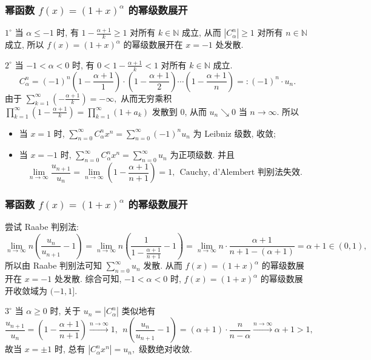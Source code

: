\begin{frame}
\frametitle{幂函数 $f(x) = (1 + x)^{\alpha}$ 的幂级数展开}

$1^\circ$ 当 $\alpha \leqslant -1$ 时, 有 $1 - \frac{\alpha+1}{k} \geqslant 1$ 对所有 $k \in \mathbb{N}$ 成立, 从而 $|C_\alpha^n| \geqslant 1$ 对所有 $n \in \mathbb{N}$ 成立, 所以 $f(x) = (1 + x)^{\alpha}$ 的幂级数展开在 $x = -1$ 处发散.

\pause
\vspace{0.5em}

$2^\circ$ 当 $-1 < \alpha < 0$ 时, 有 $0 < 1 - \frac{\alpha+1}{k} < 1$ 对所有 $k \in \mathbb{N}$ 成立.
\[
C_\alpha^n = (-1)^n \left( 1 - \frac{\alpha+1}{1} \right) \cdot \left( 1 - \frac{\alpha+1}{2} \right) \cdots \left( 1 - \frac{\alpha+1}{n} \right) =: (-1)^n \cdot u_n.
\]
由于 $\sum_{k=1}^\infty \left( - \frac{\alpha+1}{k} \right) = -\infty,$ 从而无穷乘积 $\prod_{k=1}^\infty \left( 1 - \frac{\alpha+1}{k} \right) = \prod_{k=1}^\infty (1 + a_k)$ 发散到 $0$, 从而 $u_n \searrow 0$ 当 $n \to \infty$. 所以
\begin{itemize}
\item 当 $x = 1$ 时, $\sum_{n=0}^\infty C_\alpha^n x^n = \sum_{n=0}^\infty (-1)^n u_n$ 为 Leibniz 级数, 收敛;
\pause
\item 当 $x = -1$ 时, $\sum_{n=0}^\infty C_\alpha^n x^n = \sum_{n=0}^\infty u_n$ 为正项级数. 并且
\[
\lim_{n \to \infty} \frac{u_{n+1}}{u_n} = \lim_{n \to \infty} \left( 1 - \frac{\alpha+1}{n+1} \right) = 1, ~~ \text{Cauchy, d'Alembert 判别法失效}.
\]
\end{itemize}

\end{frame}


\begin{frame}
\frametitle{幂函数 $f(x) = (1 + x)^{\alpha}$ 的幂级数展开}

尝试 Raabe 判别法:
\[
\lim_{n \to \infty} n \left( \frac{u_n}{u_{n+1}} - 1 \right) = \lim_{n \to \infty} n \left( \frac{1}{1 - \frac{\alpha+1}{n+1}} - 1 \right) = \lim_{n \to \infty} n \cdot \frac{\alpha+1}{n+1 - (\alpha+1)} = \alpha + 1 \in (0, 1),
\]
所以由 Raabe 判别法可知 $\sum_{n=0}^\infty u_n$ 发散. 从而 $f(x) = (1 + x)^{\alpha}$ 的幂级数展开在 $x = -1$ 处发散.
\pause
综合可知, $-1 < \alpha < 0$ 时, $f(x) = (1 + x)^{\alpha}$ 的幂级数展开收敛域为 $(-1, 1]$.

\pause
\vspace{0.5em}

$3^\circ$ 当 $\alpha \geqslant 0$ 时, 关于 $u_n = |C_\alpha^n|$ 类似地有
\[
\frac{u_{n+1}}{u_n} = \left( 1 - \frac{\alpha+1}{n+1} \right) \xrightarrow{n \to \infty} 1, ~~ n \left( \frac{u_n}{u_{n+1}} - 1 \right) = (\alpha + 1) \cdot \frac{n}{n-\alpha} \xrightarrow{n \to \infty} \alpha + 1 > 1,
\]
故当 $x = \pm 1$ 时, 总有 $|C_\alpha^n x^n| = u_n,$ 级数绝对收敛.

\end{frame}

